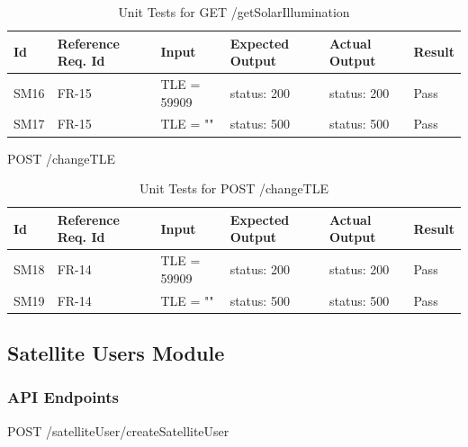 \documentclass[12pt, titlepage]{article}
\begin{document}
\begin{center}
\begin{longtable}{|p{1cm} | p{2cm} |p{2cm}| p{2cm} |p{2cm}| p{2cm}|}
\caption{Unit Tests for \newline GET /getSolarIllumination}
\hline
\textbf{Id} & \textbf{Reference Req. Id} & \textbf{Input} & \textbf{Expected Output} & \textbf{Actual Output} & \textbf{Result} \\
\hline
SM16 & FR-15 & { TLE = 59909 } & { status: 200 } & { status: 200 } & Pass
\\
\hline
SM17 & FR-15 & { TLE = ""} & { status: 500 } & { status: 500 } & Pass
\\
\hline

\end{longtable}

\end{center}

POST /changeTLE

\begin{center}
\begin{longtable}{|p{1cm} | p{2cm} |p{2cm}| p{2cm} |p{2cm}| p{2cm}|}
\caption{Unit Tests for \newline POST /changeTLE}
\hline
\textbf{Id} & \textbf{Reference Req. Id} & \textbf{Input} & \textbf{Expected Output} & \textbf{Actual Output} & \textbf{Result} \\
\hline
SM18 & FR-14 & { TLE = 59909 } & { status: 200 } & { status: 200 } & Pass
\\
\hline
SM19 & FR-14 & { TLE = ""} & { status: 500 } & { status: 500 } & Pass
\\
\hline

\end{longtable}

\end{center}

\subsection{Satellite Users Module}
\subsubsection{API Endpoints}


POST /satelliteUser/createSatelliteUser
\end{document}
